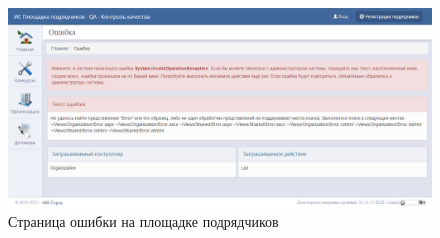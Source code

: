 \begin{figure}[h!]
	\begin{center}
		\begin{minipage}[h]{\linewidth}
			\centering
			\includegraphics[width=\linewidth]{images/software-contractorErrorAll.png}
			\caption{Страница ошибки на площадке подрядчиков}
			\label{img:software-contractorErrorAll}
		\end{minipage}
		\hfill
	\end{center}
\end{figure}

\clearpage
\newpage